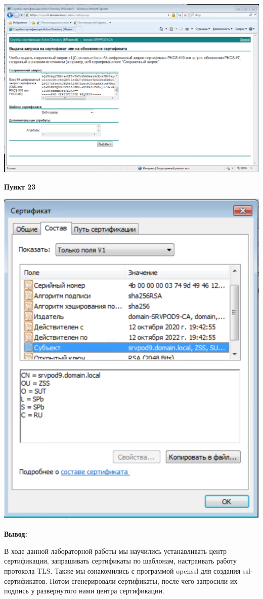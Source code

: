 \documentclass[a4paper,14pt]{extarticle}
\begin{document}
    \begin{center}
        \includegraphics[scale=0.55]{20-22}
    \end{center}
    \textbf{Пункт 23}
    \begin{center}
        \includegraphics[scale=0.8]{23}
    \end{center}
    \newpage
    \textbf{Вывод:}

    В ходе данной лабораторной работы мы научились устанавливать центр 
    сертификации, запрашивать сертификаты по шаблонам, настраивать работу
    протокола TLS. Также мы ознакомились с программой openssl для создания 
    ssl-сертификатов. Потом сгенерировали сертификаты, после чего запросили 
    их подпись у развернутого нами центра сертификации.
\end{document}
